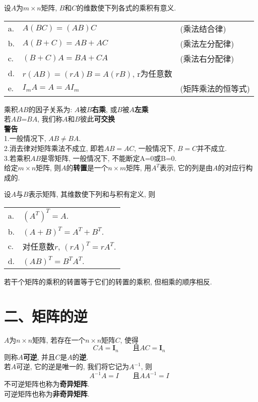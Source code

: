 \begin{theorem}
设$A$为$m\times n$矩阵, $B$和$C$的维数使下列各式的乘积有意义.\\
\begin{tabular}{l@{\ }l l}
a. & $A(BC)=(AB)C$ & (乘法结合律)\\
b. & $A(B+C)=AB+AC$ & (乘法左分配律)\\
c. & $(B+C)A=BA+CA$ & (乘法右分配律)\\
d. & $r(AB)=(rA)B=A(rB)$, r为任意数 &\\
e. & $I_mA=A=AI_m$ & (矩阵乘法的恒等式)
\end{tabular}
\end{theorem}\vspace{4ex}

乘积$AB$的因子关系为: $A$被$B$\textbf{右乘}, 或$B$被$A$\textbf{左乘}\\
若$AB$=$BA$, 我们称$A$和$B$彼此\textbf{可交换}\\[2ex]

\textbf{警告}\\
1.一般情况下, $AB\neq BA$.\\
2.消去律对矩阵乘法不成立, 即若$AB=AC$, 一般情况下, $B=C$并不成立.\\
3.若乘积$AB$是零矩阵, 一般情况下, 不能断定A=0或B=0.\\[2ex]

给定$m\times n$矩阵, 则$A$的\textbf{转置}是一个$n\times m$矩阵, 用$A^T$表示, 它的列是由$A$的对应行构成的.\\[2ex]

\begin{theorem}
设$A$与$B$表示矩阵, 其维数使下列和与积有定义, 则\\
\begin{tabular}{l@{\ }l}
a. & $(A^T)^T=A$.\\
b. & $(A+B)^T=A^T+B^T$.\\
c. & 对任意数$r$, $(rA)^T=rA^T$.\\
d. & $(AB)^T=B^TA^T$.
\end{tabular}
\end{theorem}\vspace{4ex}

\begin{law}
若干个矩阵的乘积的转置等于它们的转置的乘积, 但相乘的顺序相反.
\end{law}\vspace{8ex}

\section{二、矩阵的逆}
$A$为$n\times n$矩阵, 若存在一个$n\times n$矩阵$C$, 使得
\[CA=\bm{I}_n\qquad\text{且}AC=\bm{I}_n\]
则称$A$\textbf{可逆}, 并且$C$是$A$的\textbf{逆}.\\[2ex]
若$A$可逆, 它的逆是唯一的, 我们将它记为$A^{-1}$, 则
\[A^{-1}A=I\qquad\text{且}AA^{-1}=I\]
不可逆矩阵也称为\textbf{奇异矩阵}.\\
可逆矩阵也称为\textbf{非奇异矩阵}.\\[2ex]


